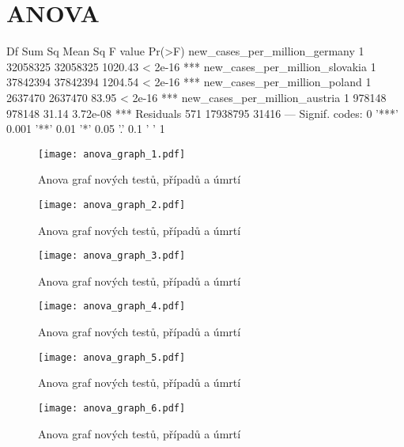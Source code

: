 \documentclass[a4paper, 12pt]{article}
\begin{document}
\section{ANOVA}

\begin{Schunk}
\begin{Soutput}
                                Df   Sum Sq  Mean Sq F value   Pr(>F)    
new_cases_per_million_germany    1 32058325 32058325 1020.43  < 2e-16 ***
new_cases_per_million_slovakia   1 37842394 37842394 1204.54  < 2e-16 ***
new_cases_per_million_poland     1  2637470  2637470   83.95  < 2e-16 ***
new_cases_per_million_austria    1   978148   978148   31.14 3.72e-08 ***
Residuals                      571 17938795    31416                     
---
Signif. codes:  0 '***' 0.001 '**' 0.01 '*' 0.05 '.' 0.1 ' ' 1
\end{Soutput}
\end{Schunk}

\begin{figure}[H]
\centering

\texttt{[image: anova\_graph\_1.pdf]}
\caption{Anova graf nových testů, případů a úmrtí}

\end{figure}

\begin{figure}[H]
\centering

\texttt{[image: anova\_graph\_2.pdf]}
\caption{Anova graf nových testů, případů a úmrtí}

\texttt{[image: anova\_graph\_3.pdf]}
\caption{Anova graf nových testů, případů a úmrtí}

\end{figure}

\begin{figure}[H]
\centering

\texttt{[image: anova\_graph\_4.pdf]}
\caption{Anova graf nových testů, případů a úmrtí}

\texttt{[image: anova\_graph\_5.pdf]}
\caption{Anova graf nových testů, případů a úmrtí}

\end{figure}

\begin{figure}[H]
\centering

\texttt{[image: anova\_graph\_6.pdf]}
\caption{Anova graf nových testů, případů a úmrtí}

\end{figure}
\end{document}
